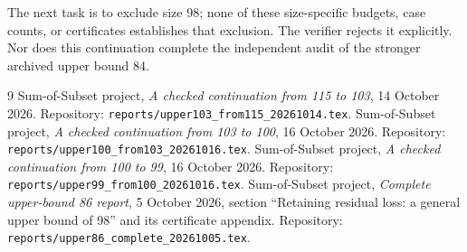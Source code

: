 \documentclass[11pt,a4paper]{article}
\begin{document}
The next task is to exclude size 98; none of these size-specific budgets,
case counts, or certificates establishes that exclusion. The verifier
rejects it explicitly. Nor does this continuation complete the independent
audit of the stronger archived upper bound 84.

\begin{thebibliography}{9}
 Sum-of-Subset project,
\emph{A checked continuation from 115 to 103}, 14 October 2026.
Repository: \texttt{reports/upper103\_from115\_20261014.tex}.
 Sum-of-Subset project,
\emph{A checked continuation from 103 to 100}, 16 October 2026.
Repository: \texttt{reports/upper100\_from103\_20261016.tex}.
 Sum-of-Subset project,
\emph{A checked continuation from 100 to 99}, 16 October 2026.
Repository: \texttt{reports/upper99\_from100\_20261016.tex}.
 Sum-of-Subset project,
\emph{Complete upper-bound 86 report}, 5 October 2026,
section ``Retaining residual loss: a general upper bound of 98'' and
its certificate appendix.
Repository: \texttt{reports/upper86\_complete\_20261005.tex}.
\end{thebibliography}
\end{document}
